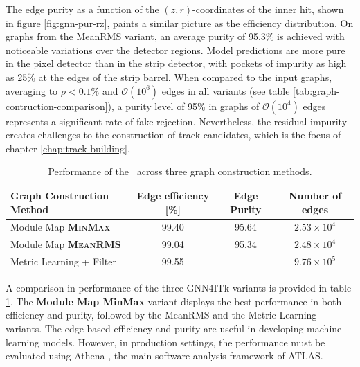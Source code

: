 The edge purity as a function of the $(z,r)$-coordinates of the inner hit, shown in figure \ref{fig:gnn-pur-rz}, paints a similar picture as the efficiency distribution.
On graphs from the MeanRMS variant, an average purity of 95.3\% is achieved with noticeable variations over the detector regions.
Model predictions are more pure in the pixel detector than in the strip detector, with pockets of impurity as high as 25\% at the edges of the strip barrel. 
When compared to the input graphs, averaging to $\rho <0.1\%$ and $\mathcal{O}(10^6)$ edges in all variants (see table \ref{tab:graph-contruction-comparison}), a purity level of 95\% in graphs of $\mathcal{O}(10^4)$ edges represents a significant rate of fake rejection. 
Nevertheless, the residual impurity creates challenges to the construction of track candidates, which is the focus of chapter \ref{chap:track-building}.

\begin{table}[h!]
    \centering
    \begin{tabular}{l|c|c|c}
      Graph Construction Method  & Edge efficiency [\%] & Edge Purity & Number of edges  \\
      \hline \hline
        Module Map \textbf{\textsc{MinMax}} & 99.40 & 95.64 & $2.53\times 10^4$ \\
        Module Map \textbf{\textsc{MeanRMS}} & 99.04  & 95.34 & $2.48\times 10^4$ \\
        Metric Learning + Filter & 99.55  & & $9.76\times 10^5$\\
        \hline
    \end{tabular}
    \caption{Performance of the \ignn~across three graph construction methods. }
    \label{tab:edge-classification-comparison}
\end{table}

A comparison in performance of the three GNN4ITk variants is provided in table \ref{tab:edge-classification-comparison}.
The \textbf{Module Map MinMax} variant displays the best performance in both efficiency and purity, followed by the MeanRMS and the Metric Learning variants.
The edge-based efficiency and purity are useful in developing machine learning models. 
However, in production settings, the performance must be evaluated using Athena \cite{atlas_collaboration_2021_4772550}, the main software analysis framework of ATLAS.

